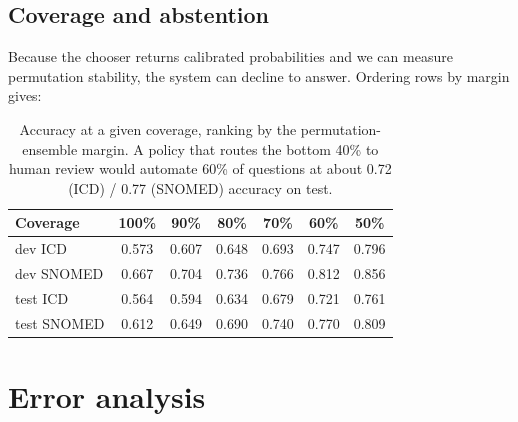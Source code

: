 \documentclass[11pt]{article}
\begin{document}
\subsection{Coverage and abstention}
Because the chooser returns calibrated probabilities and we can measure permutation
stability, the system can decline to answer. Ordering rows by margin gives:

\begin{table}[H]
\centering
\small
\begin{tabular}{@{}lcccccc@{}}
\toprule
Coverage & 100\% & 90\% & 80\% & 70\% & 60\% & 50\%\\
\midrule
dev ICD & 0.573 & 0.607 & 0.648 & 0.693 & 0.747 & 0.796\\
dev SNOMED & 0.667 & 0.704 & 0.736 & 0.766 & 0.812 & 0.856\\
test ICD & 0.564 & 0.594 & 0.634 & 0.679 & 0.721 & 0.761\\
test SNOMED & 0.612 & 0.649 & 0.690 & 0.740 & 0.770 & 0.809\\
\bottomrule
\end{tabular}
\caption{Accuracy at a given coverage, ranking by the permutation-ensemble margin. A
policy that routes the bottom 40\% to human review would automate 60\% of questions at
about 0.72 (ICD) / 0.77 (SNOMED) accuracy on test.}
\end{table}

\section{Error analysis}
\end{document}
